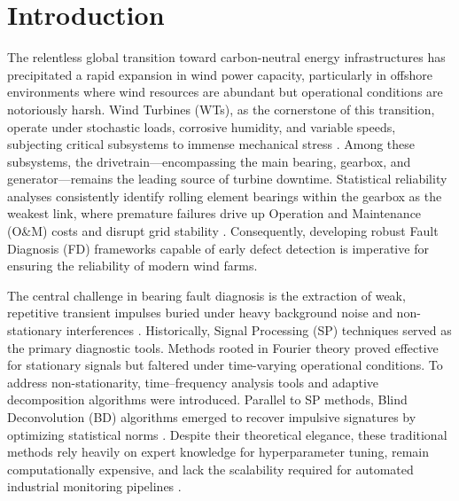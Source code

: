 \documentclass[5p,times,twocolumn]{elsarticle}
\begin{document}
\section{Introduction}
\label{sec:introduction}

The relentless global transition toward carbon-neutral energy infrastructures has precipitated a rapid expansion in wind power capacity, particularly in offshore environments where wind resources are abundant but operational conditions are notoriously harsh. Wind Turbines (WTs), as the cornerstone of this transition, operate under stochastic loads, corrosive humidity, and variable speeds, subjecting critical subsystems to immense mechanical stress \cite{P7_Hosseini}. Among these subsystems, the drivetrain—encompassing the main bearing, gearbox, and generator—remains the leading source of turbine downtime. Statistical reliability analyses consistently identify rolling element bearings within the gearbox as the weakest link, where premature failures drive up Operation and Maintenance (O\&M) costs and disrupt grid stability \cite{P1_Lu, P5_Yu}. Consequently, developing robust Fault Diagnosis (FD) frameworks capable of early defect detection is imperative for ensuring the reliability of modern wind farms.

The central challenge in bearing fault diagnosis is the extraction of weak, repetitive transient impulses buried under heavy background noise and non-stationary interferences \cite{P3_Dibaj}. Historically, Signal Processing (SP) techniques served as the primary diagnostic tools. Methods rooted in Fourier theory proved effective for stationary signals but faltered under time-varying operational conditions. To address non-stationarity, time--frequency analysis tools \cite{P38_Chen, P11_Li, P31_He} and adaptive decomposition algorithms \cite{P27_Zhang, P28_He, P26_Chen} were introduced. Parallel to SP methods, Blind Deconvolution (BD) algorithms emerged to recover impulsive signatures by optimizing statistical norms \cite{P34_Huang, P22_He, P24_Cheng, P25_Zhang, P33_Wang}. Despite their theoretical elegance, these traditional methods rely heavily on expert knowledge for hyperparameter tuning, remain computationally expensive, and lack the scalability required for automated industrial monitoring pipelines \cite{P30_Li, P32_Liao}.
\end{document}
